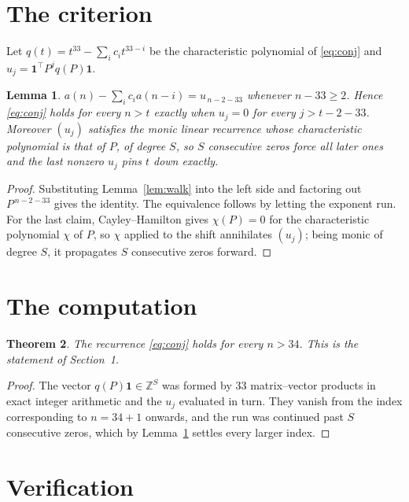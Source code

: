 \documentclass[11pt,a4paper]{article}
\theoremstyle{plain}
\newtheorem{theorem}{Theorem}
\newtheorem{lemma}[theorem]{Lemma}
\theoremstyle{definition}
\begin{document}
\section{The criterion}

Let $q(t)=t^{33}-\sum_i c_i t^{33-i}$ be the characteristic polynomial of
\eqref{eq:conj} and $u_j=\mathbf{1}^{\!\top}P^{j}q(P)\mathbf{1}$.

\begin{lemma}\label{lem:crit}
$a(n)-\sum_i c_i a(n-i)=u_{\,n-2-33}$ whenever $n-33\ge2$. Hence
\eqref{eq:conj} holds for every $n>t$ exactly when $u_j=0$ for every
$j>t-2-33$. Moreover $(u_j)$ satisfies the monic linear recurrence whose
characteristic polynomial is that of $P$, of degree $S$, so $S$ consecutive zeros force all
later ones and the last nonzero $u_j$ pins $t$ down exactly.
\end{lemma}

\begin{proof}
Substituting Lemma~\ref{lem:walk} into the left side and factoring out
$P^{\,n-2-33}$ gives the identity. The equivalence follows by letting the exponent
run. For the last claim, Cayley--Hamilton gives $\chi(P)=0$ for the characteristic
polynomial $\chi$ of $P$, so $\chi$ applied to the shift annihilates $(u_j)$; being monic of
degree $S$, it propagates $S$ consecutive zeros forward.
\end{proof}

\section{The computation}

\begin{theorem}
The recurrence \eqref{eq:conj} holds for every $n>34$. This is the statement of
Section~1.
\end{theorem}

\begin{proof}
The vector $q(P)\mathbf{1}\in\mathbb{Z}^{S}$ was formed by $33$ matrix--vector
products in exact integer arithmetic and the $u_j$ evaluated in turn. They vanish from the
index corresponding to $n=34+1$ onwards, and the run was continued past $S$ consecutive
zeros, which by Lemma~\ref{lem:crit} settles every larger index.
\end{proof}

\section{Verification}
\end{document}
